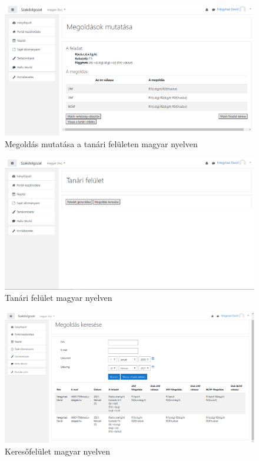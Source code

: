 \begin{figure}
    \centering
    \includegraphics[scale=0.4]{Fejezetek/Images/magyar04.png}
    \caption{Megoldás mutatása a tanári felületen magyar nyelven}
\end{figure}
\begin{figure}
    \centering
    \includegraphics[scale=0.4]{Fejezetek/Images/magyar05.png}
    \caption{Tanári felület magyar nyelven}
\end{figure}
\begin{figure}
    \centering
    \includegraphics[scale=0.4]{Fejezetek/Images/magyar06.png}
    \caption{Keresőfelület magyar nyelven}
\end{figure}

